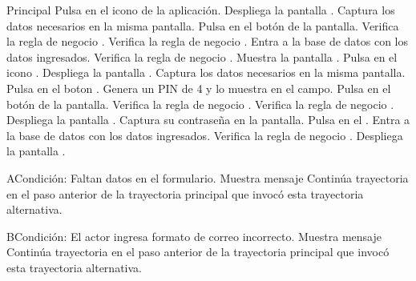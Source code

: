 	\begin{UCtrayectoria}{Principal}
		\UCpaso[\UCactor] Pulsa en el icono de la aplicación.
		\UCpaso[\UCsist] Despliega la pantalla .
		\UCpaso[\UCactor] Captura los datos necesarios en la misma pantalla.
		\UCpaso[\UCactor] Pulsa en el botón  de la pantalla.
		\UCpaso[\UCsist] Verifica la regla de negocio . 
		\UCpaso[\UCsist] Verifica la regla de negocio . 
		\UCpaso[\UCsist] Entra a la base de datos con los datos ingresados. 
		\UCpaso[\UCsist] Verifica la regla de negocio . 		
		\UCpaso[\UCsist] Muestra la pantalla .
		\UCpaso[\UCactor] Pulsa en el icono .
		\UCpaso[\UCsist] Despliega la pantalla .
		\UCpaso[\UCactor] Captura los datos necesarios en la misma pantalla.
		\UCpaso[\UCactor] Pulsa en el boton .
		\UCpaso[\UCsist] Genera un PIN de 4  y lo muestra en el campo.
		\UCpaso[\UCactor] Pulsa en el botón  de la pantalla.
		\UCpaso[\UCsist] Verifica la regla de negocio . 
		\UCpaso[\UCsist] Verifica la regla de negocio . 
		\UCpaso[\UCsist] Despliega la pantalla .
		\UCpaso[\UCactor] Captura su contraseña en la pantalla.
		\UCpaso[\UCactor] Pulsa en el  .
		\UCpaso[\UCsist] Entra a la base de datos con los datos ingresados.  
		\UCpaso[\UCsist] Verifica la regla de negocio . 	
		\UCpaso[\UCsist] Despliega la pantalla .
	\end{UCtrayectoria}
	\begin{UCtrayectoriaA}{A}{Condición: Faltan datos en el formulario.}
		\UCpaso[\UCsist] Muestra mensaje 
		\UCpaso[\UCsist] Continúa trayectoria en el paso anterior de la trayectoria  principal que invocó esta trayectoria alternativa. 
	\end{UCtrayectoriaA}
	\begin{UCtrayectoriaA}{B}{Condición: El actor ingresa formato de correo incorrecto.}
		\UCpaso[\UCsist] Muestra mensaje 
		\UCpaso[\UCsist] Continúa trayectoria en el paso anterior de la trayectoria  principal que invocó esta trayectoria alternativa.  
	\end{UCtrayectoriaA}
